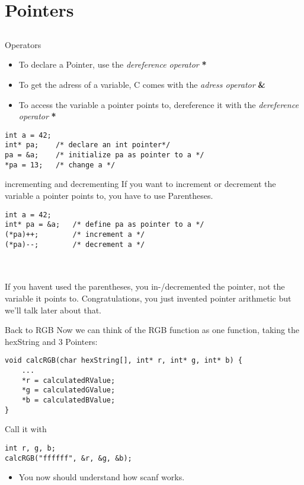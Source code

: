 \section{Pointers}
\subsection{}
\begin{frame}[fragile]{Operators}
	\begin{itemize}
		\item To declare a Pointer, use the \textit{dereference operator} \textbf{*}
		\item To get the adress of a variable, C comes with the \textit{adress operator} \textbf{\&}
		\item To access the variable a pointer points to, dereference it with the \textit{dereference operator} \textbf{*}
	\end{itemize}
	\begin{lstlisting}[numbers=none]
int a = 42;
int* pa;	/* declare an int pointer*/
pa = &a;	/* initialize pa as pointer to a */
*pa = 13;	/* change a */
\end{lstlisting}
\end{frame}
\begin{frame}[fragile]{incrementing and decrementing}
	If you want to increment or decrement the variable a pointer points to, you have to use Parentheses.
	\begin{lstlisting}[numbers=none]
int a = 42;
int* pa = &a;	/* define pa as pointer to a */
(*pa)++;		/* increment a */
(*pa)--;		/* decrement a */
\end{lstlisting}
\ \\\ \\
If you havent used the parentheses, you in-/decremented the pointer, not the variable it points to. Congratulations, you just invented pointer arithmetic but we'll talk later about that.
\end{frame}
\begin{frame}[fragile]{Back to RGB}
	Now we can think of the RGB function as one function, taking the hexString and 3 Pointers:
	\begin{lstlisting}[numbers=none]
void calcRGB(char hexString[], int* r, int* g, int* b) {
	...
	*r = calculatedRValue;
	*g = calculatedGValue;
	*b = calculatedBValue;
}
\end{lstlisting}
	Call it with
	\begin{lstlisting}[numbers=none]
int r, g, b;
calcRGB("ffffff", &r, &g, &b);
\end{lstlisting}
	\begin{itemize}
		\item You now should understand how scanf works.
	\end{itemize}
\end{frame}
